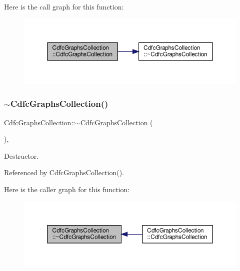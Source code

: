 Here is the call graph for this function\+:
\nopagebreak
\begin{figure}[H]
\begin{center}
\leavevmode
\includegraphics[width=350pt]{d7/d46/classCdfcGraphsCollection_a20aad56ae7626fed60060372f4164f72_cgraph}
\end{center}
\end{figure}
\mbox{\label{classCdfcGraphsCollection_a5fa5fc9fca56c45cc1e04f617cde2dc4}} 
\subsubsection{\texorpdfstring{$\sim$\+Cdfc\+Graphs\+Collection()}{~CdfcGraphsCollection()}}
{\footnotesize\ttfamily Cdfc\+Graphs\+Collection\+::$\sim$\+Cdfc\+Graphs\+Collection (\begin{DoxyParamCaption}{ }\end{DoxyParamCaption})\hspace{0.3cm}{\ttfamily [override]}, {\ttfamily [default]}}



Destructor. 



Referenced by Cdfc\+Graphs\+Collection().

Here is the caller graph for this function\+:
\nopagebreak
\begin{figure}[H]
\begin{center}
\leavevmode
\includegraphics[width=350pt]{d7/d46/classCdfcGraphsCollection_a5fa5fc9fca56c45cc1e04f617cde2dc4_icgraph}
\end{center}
\end{figure}


